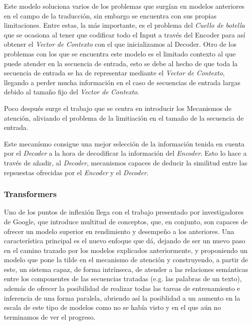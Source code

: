 Este modelo soluciona varios de los problemas que surgían en modelos anteriores en el campo de la traducción, sin embargo se encuentra con sus propias limitaciones. Entre estas, la más importante, es el problema del \textit{Cuello de botella} que se ocasiona al tener que codificar todo el Input a través del Encoder para así obtener el \textit{Vector de Contexto} con el que inicializamos al Decoder. Otro de los problemas con los que se encuentra este modelo es el limitado contexto al que puede atender en la secuencia de entrada, esto se debe al hecho de que toda la secuencia de entrada se ha de representar mediante el \textit{Vector de Contexto}, llegando a perder mucha información en el caso de secuencias de entrada largas debido al tamaño fijo del \textit{Vector de Contexto}.

Poco después surge el trabajo \cite{bahdanau2014neural} que se centra en introducir los Mecanismos de atención, aliviando el problema de la limitiación en el tamaño de la secuencia de entrada.

Este mecanísmo consigue una mejor selección de la información tenida en cuenta por el \textit{Decoder} a la hora de decodificar la información del \textit{Encoder}. Esto lo hace a través de añadir, al \textit{Decoder}, mecanismos capaces de deducir la similitud entre las repsuestas ofrecidas por el \textit{Encoder} y el \textit{Decoder}.

\subsubsection{Transformers}

Uno de los puntos de inflexión llega con el trabajo \cite{vaswani2017attention} presentado por investigadores de Google, que introduce multitud de conceptos, que, en conjunto, son capaces de ofrecer un modelo superior en rendimiento y desempeño a los anteriores. Una característica principal es el nuevo enfoque que dá, dejando de ser un nuevo paso en el camino trazado por los modelos explicados anteriormente, y proponiendo un modelo que pone la tilde en el mecanismo de atención y construyendo, a partir de este, un sistema capaz, de forma intrínseca, de atender a las relaciones semánticas entre los componentes de las secuencias tratadas (e.g. las palabras de un texto), además de ofrecer la posibilidad de realizar todas las tareas de entrenamiento e inferencia de una forma paralela, abriendo así la posiblidad a un aumento en la escala de este tipo de modelos como no se había visto y en el que aún no terminamos de ver el progreso.

